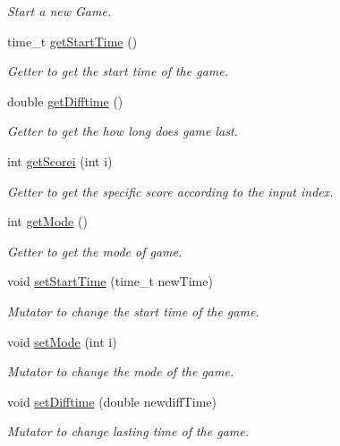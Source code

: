 \begin{DoxyCompactItemize}
\begin{DoxyCompactList}\small\item\em Start a new Game. \end{DoxyCompactList}\item 
\hypertarget{classPongGame_aa920817372d5aa5f8309ceb6b10d3a5e}{time\+\_\+t \hyperlink{classPongGame_aa920817372d5aa5f8309ceb6b10d3a5e}{get\+Start\+Time} ()}\label{classPongGame_aa920817372d5aa5f8309ceb6b10d3a5e}

\begin{DoxyCompactList}\small\item\em Getter to get the start time of the game. \end{DoxyCompactList}\item 
\hypertarget{classPongGame_aa96aa2608d7c211319175857faf3dbf6}{double \hyperlink{classPongGame_aa96aa2608d7c211319175857faf3dbf6}{get\+Difftime} ()}\label{classPongGame_aa96aa2608d7c211319175857faf3dbf6}

\begin{DoxyCompactList}\small\item\em Getter to get the how long does game last. \end{DoxyCompactList}\item 
int \hyperlink{classPongGame_acf5bed550d45e295b7ba231f5c77f8b7}{get\+Scorei} (int i)
\begin{DoxyCompactList}\small\item\em Getter to get the specific score according to the input index. \end{DoxyCompactList}\item 
\hypertarget{classPongGame_afa96567179aa1748c3fb63ed83524ccb}{int \hyperlink{classPongGame_afa96567179aa1748c3fb63ed83524ccb}{get\+Mode} ()}\label{classPongGame_afa96567179aa1748c3fb63ed83524ccb}

\begin{DoxyCompactList}\small\item\em Getter to get the mode of game. \end{DoxyCompactList}\item 
void \hyperlink{classPongGame_a15649211e81c19c363c1b37be73d4d90}{set\+Start\+Time} (time\+\_\+t new\+Time)
\begin{DoxyCompactList}\small\item\em Mutator to change the start time of the game. \end{DoxyCompactList}\item 
void \hyperlink{classPongGame_a0e74f3db80283de1fae5a018f6e62f35}{set\+Mode} (int i)
\begin{DoxyCompactList}\small\item\em Mutator to change the mode of the game. \end{DoxyCompactList}\item 
void \hyperlink{classPongGame_ac4f09e4632cfda46521fdce2fe0f7167}{set\+Difftime} (double newdiff\+Time)
\begin{DoxyCompactList}\small\item\em Mutator to change lasting time of the game. \end{DoxyCompactList}\end{DoxyCompactItemize}


